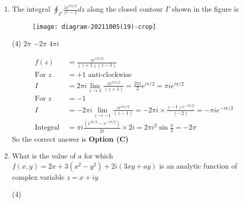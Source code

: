 \begin{note}
\begin{enumerate}[label=\color{ocre}\textbf{\arabic*.}]
\begin{answer}
\begin{align*}
		\intertext{Differentiating partially with $x$ gives}
		\frac{\partial v}{\partial x}&=\frac{a^{2} e^{a x} \sin (b y)}{b}\hspace{2cm}\text{(iv)}
		\intertext{From equation (iii) and (iv)}
		b e^{a x} \sin (b y)&=\frac{a^{2} e^{a x} \sin (b y)}{b}\\
		\Rightarrow b^{2}&=a^{2} \Rightarrow b=\pm a
		\end{align*}
		So the correct answer is \textbf{Option (B)}
	\end{answer}
	\item  The integral $\oint_{\Gamma} \frac{z e^{i \pi z / 2}}{z^{2}-1} d z$ along the closed contour $\Gamma$ shown in the figure is
	{}
	\begin{figure}[H]
		\centering
		\texttt{[image: diagram-20211005(19)-crop]}
	\end{figure}
	\begin{tasks}(4)
		\task[\textbf{B.}] $2 \pi$
		\task[\textbf{C.}] $-2 \pi$
		\task[\textbf{D.}] $4 \pi i$
	\end{tasks}
	\begin{answer}
		\begin{align*}
		f(z)&=\frac{z e^{i z \pi / 2}}{(z+1)(z-1)}\\
		\text{For }z&=+1\text{ anti-clockwise}\\
		I&=2 \pi i \lim _{z \rightarrow 1} \frac{z e^{i \pi z / 2}}{(z+1)}=\frac{2 \pi i}{2} e^{i \pi / 2}=\pi i e^{i \pi / 2}\\
		\text{For }z&=-1\\
		I&=-2 \pi i \lim _{z \rightarrow-1} \frac{z e^{i \pi z / 2}}{(z-1)}=-2 \pi i \times \frac{(-1) e^{-i \pi / 2}}{(-2)}=-\pi i e^{-i \pi / 2}\\
		\text{Integral }&=\pi i \frac{\left(e^{i \pi / 2}-e^{-i \pi / 2}\right)}{2 i} \times 2 i=2 \pi i^{2} \sin \frac{\pi}{2}=-2 \pi
		\end{align*}
		So the correct answer is \textbf{Option (C)}
	\end{answer}
	\item What is the value of $a$ for which $f(x, y)=2 x+3\left(x^{2}-y^{2}\right)+2 i(3 x y+a y)$ is an analytic function of complex variable $z=x+i y$
	{}
	\begin{tasks}(4)
	\end{tasks}
	\begin{answer}

\end{answer}
\end{enumerate}
\end{note}
